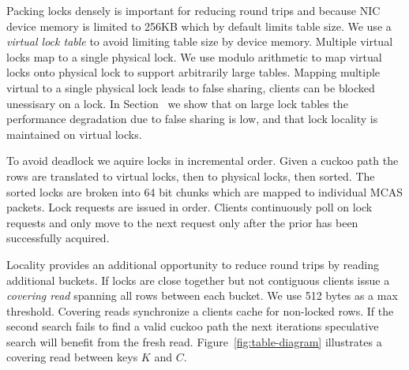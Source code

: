 Packing locks densely is important for reducing round trips
and because  NIC device memory is limited to 256KB which by
default limits table size. We use a \textit{virtual lock
table} to avoid limiting table size by device memory.
Multiple virtual locks map to a single physical lock. We use
modulo arithmetic to map virtual locks onto physical lock to
support arbitrarily large tables. Mapping multiple virtual
to a single physical lock leads to false sharing, clients
can be blocked unessisary on a lock.  In Section~
we show that on large lock tables the performance
degradation due to false sharing is low, and that lock
locality is maintained on virtual locks.

To avoid deadlock we aquire locks in incremental order.
Given a cuckoo path the rows are translated to virtual
locks, then to physical locks, then sorted. The sorted
locks are broken into 64 bit chunks which are mapped to
individual MCAS packets.  Lock requests are issued in order.
Clients continuously poll on lock requests and only move to
the next request only after the prior has been successfully
acquired.

Locality provides an additional opportunity to reduce round
trips by reading additional buckets. If locks are close
together but not contiguous clients issue a \textit{covering
read} spanning all rows between each bucket. We use 512
bytes as a max threshold. Covering reads synchronize a
clients cache for non-locked rows. If the second search
fails to find a valid cuckoo path the next iterations
speculative search will benefit from the fresh read.
Figure~\ref{fig:table-diagram} illustrates a covering read
between keys $K$ and $C$.


